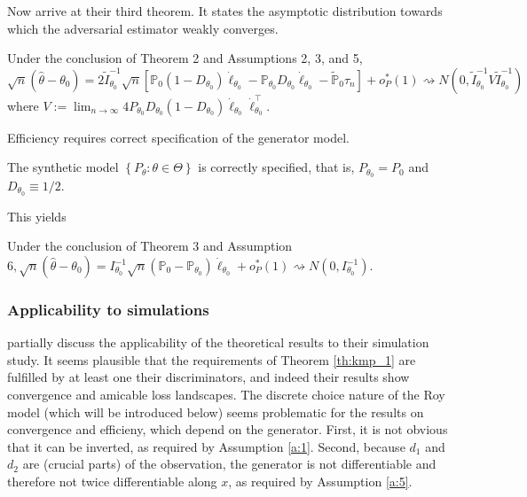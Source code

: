 Now \textcite{kaji2023adversarial} arrive at their third theorem.
It states the asymptotic distribution towards which the adversarial estimator weakly converges.

\begin{theorem}
    Under the conclusion of Theorem 2 and Assumptions 2, 3, and 5,
    \begin{equation}
        \sqrt{n}\left(\hat{\theta}-\theta_{0}\right)=2 \tilde{I}_{\theta_{0}}^{-1} \sqrt{n}\left[\mathbb{P}_{0}\left(1-D_{\theta_{0}}\right) \dot{\ell}_{\theta_{0}}-\mathbb{P}_{\theta_{0}} D_{\theta_{0}} \dot{\ell}_{\theta_{0}}-\tilde{\mathbb{P}}_{0} \tau_{n}\right]+o_{P}^{*}(1) \rightsquigarrow N\left(0, \tilde{I}_{\theta_{0}}^{-1} V \tilde{I}_{\theta_{0}}^{-1}\right)
    \end{equation}
    where $V:=\lim _{n \rightarrow \infty} 4 P_{\theta_{0}} D_{\theta_{0}}\left(1-D_{\theta_{0}}\right) \dot{\ell}_{\theta_{0}} \dot{\ell}_{\theta_{0}}^{\top}$.\\
\end{theorem}

Efficiency requires correct specification of the generator model.

\begin{assumption}[A6, KMP]
    The synthetic model $\left\{P_{\theta}: \theta \in \Theta\right\}$ is correctly specified, that is, $P_{\theta_{0}}=P_{0}$ and $D_{\theta_{0}} \equiv 1 / 2$.
\end{assumption}

This yields

\begin{theorem}
    Under the conclusion of Theorem 3 and Assumption $6, \sqrt{n}\left(\hat{\theta}-\theta_{0}\right)=I_{\theta_{0}}^{-1} \sqrt{n}\left(\mathbb{P}_{0}-\mathbb{P}_{\theta_{0}}\right) \dot{\ell}_{\theta_{0}}+o_{P}^{*}(1) \rightsquigarrow N\left(0, I_{\theta_{0}}^{-1}\right)$.
\end{theorem}

\subsubsection{Applicability to simulations}
\label{sec:theoerem_simulation}

\textcite{kaji2023adversarial} partially discuss the applicability of the theoretical results to their simulation study.
It seems plausible that the requirements of Theorem \ref{th:kmp_1} are fulfilled by at least one their discriminators, and indeed their results show convergence and amicable loss landscapes.
The discrete choice nature of the Roy model (which will be introduced below) seems problematic for the results on convergence and efficieny, which depend on the generator. %
First, it is not obvious that it can be inverted, as required by Assumption \ref{a:1}.
Second, because $d_1$ and $d_2$ are (crucial parts) of the observation, the generator is not differentiable and therefore not twice differentiable along $x$, as required by Assumption \ref{a:5}.


